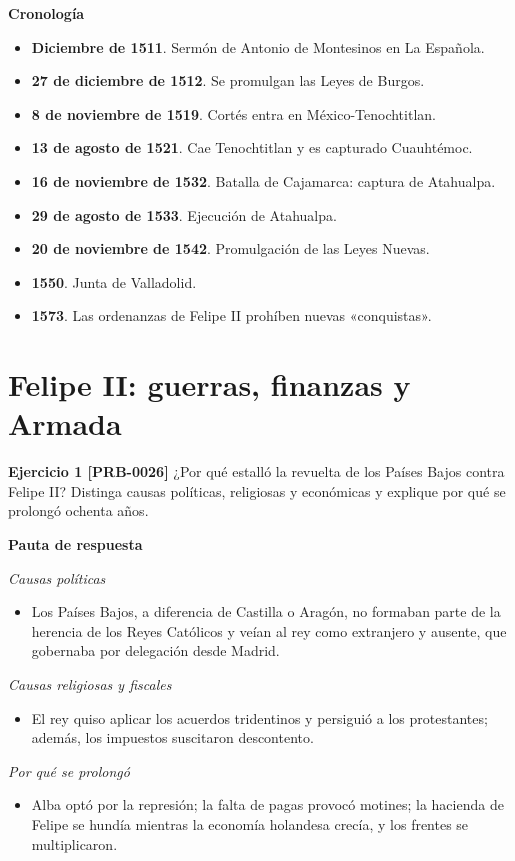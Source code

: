 \documentclass{book}
\begin{document}
\noindent\textbf{Cronología}
\begin{itemize}
\item \textbf{Diciembre de 1511}. Sermón de Antonio de Montesinos en La Española.
\item \textbf{27 de diciembre de 1512}. Se promulgan las Leyes de Burgos.
\item \textbf{8 de noviembre de 1519}. Cortés entra en México-Tenochtitlan.
\item \textbf{13 de agosto de 1521}. Cae Tenochtitlan y es capturado Cuauhtémoc.
\item \textbf{16 de noviembre de 1532}. Batalla de Cajamarca: captura de Atahualpa.
\item \textbf{29 de agosto de 1533}. Ejecución de Atahualpa.
\item \textbf{20 de noviembre de 1542}. Promulgación de las Leyes Nuevas.
\item \textbf{1550}. Junta de Valladolid.
\item \textbf{1573}. Las ordenanzas de Felipe II prohíben nuevas «conquistas».
\end{itemize}

\section{Felipe II: guerras, finanzas y Armada}

\noindent\textbf{Ejercicio 1 [PRB-0026]}
¿Por qué estalló la revuelta de los Países Bajos contra Felipe II? Distinga causas políticas, religiosas y económicas y explique por qué se prolongó ochenta años.


\noindent\textbf{Pauta de respuesta}

\noindent\textit{Causas políticas}
\begin{itemize}
\item Los Países Bajos, a diferencia de Castilla o Aragón, no formaban parte de la herencia de los Reyes Católicos y veían al rey como extranjero y ausente, que gobernaba por delegación desde Madrid.
\end{itemize}

\noindent\textit{Causas religiosas y fiscales}
\begin{itemize}
\item El rey quiso aplicar los acuerdos tridentinos y persiguió a los protestantes; además, los impuestos suscitaron descontento.
\end{itemize}

\noindent\textit{Por qué se prolongó}
\begin{itemize}
\item Alba optó por la represión; la falta de pagas provocó motines; la hacienda de Felipe se hundía mientras la economía holandesa crecía, y los frentes se multiplicaron.
\end{itemize}
\end{document}
